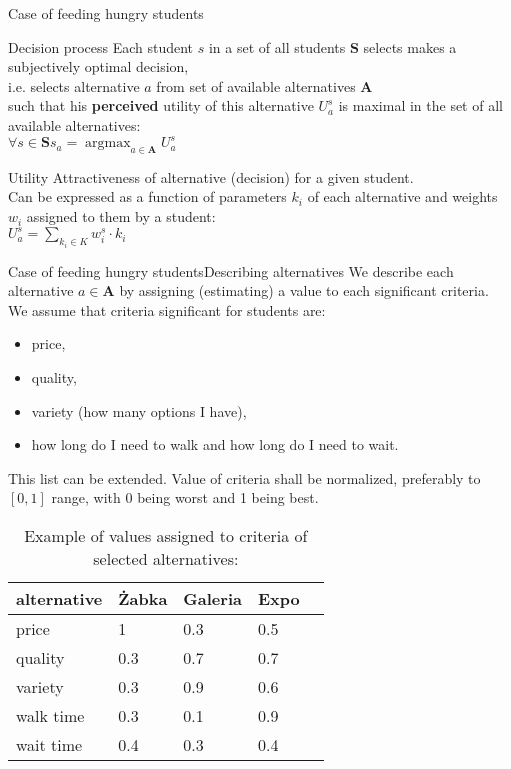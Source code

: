 \documentclass{beamer}
\newcommand\male{\fontsize{8}{7.2}\selectfont}
\DeclareMathOperator*{\argmax}{argmax}
\begin{document}
\begin{frame}{Case of feeding hungry students}
\male
\begin{block}{Decision process}
Each student $s$ in a set of all students $\bm{S}$ selects makes a subjectively optimal decision,\\ i.e. selects alternative $a$ from set of available alternatives $\bm{A}$ \\ such that his \textbf{perceived} utility of this alternative $U_a^s$ is maximal in the set of all available alternatives:\\
$\forall s \in \bm{S} s_a = \argmax_{a \in \bm{A}} U_a^s$
\end{block}
\begin{block}{Utility}
Attractiveness of alternative (decision) for a given student. \\ Can be expressed as a function of  parameters $k_i$ of each alternative and weights $w_i$ assigned to them by a student:\\
$U_a^s = \sum_{k_i \in K} w_i^s \cdot k_i$
\end{block}
\end{frame}

\begin{frame}{Case of feeding hungry students}{Describing alternatives}
\male
We describe each alternative $a \in \bm{A}$ by assigning (estimating) a value to each significant criteria. We assume that criteria significant for students are: \begin{itemize}
\item price, \item quality, \item variety (how many options I have), \item how long do I need to walk and how long do I need to wait. 
\end{itemize} This list can be extended. Value of criteria shall be normalized, preferably to $[0,1]$ range, with 0 being worst and 1 being best.
\begin{table}[]
\centering
\caption{\male Example of values assigned to criteria of selected alternatives:}
\label{my-label}
\begin{tabular}{l|l|l|l|l}
alternative & \.{Z}abka & Galeria & Expo  \\ \hline
price & 1 & 0.3 & 0.5 \\
quality & 0.3 & 0.7 & 0.7 \\
variety & 0.3 & 0.9 & 0.6 \\
walk time & 0.3 & 0.1 & 0.9 \\
wait time & 0.4 & 0.3 & 0.4  \\ \hline
\end{tabular}
\end{table}
\end{frame}
\end{document}
